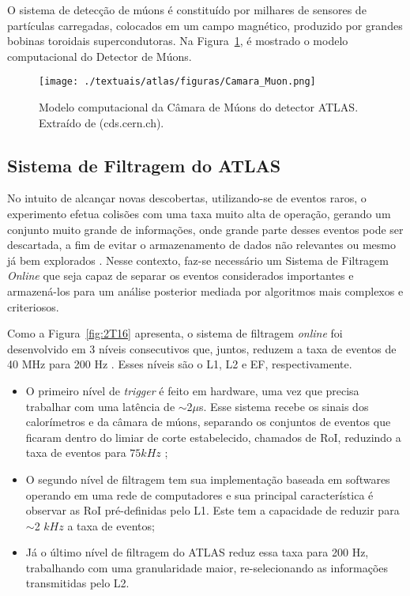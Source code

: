 O sistema de detecção de múons é constituído por milhares de sensores de partículas carregadas, colocados em um campo magnético, produzido por grandes bobinas toroidais supercondutoras. Na Figura~\ref{fig:2T14}, é mostrado o modelo computacional do Detector de Múons.

\begin{figure}[h!]
	\centering
	\texttt{[image: ./textuais/atlas/figuras/Camara\_Muon.png]}\\
	\caption{Modelo computacional da Câmara de Múons do detector ATLAS. Extraído de (cds.cern.ch).}
	\label{fig:2T14}
\end{figure}


\subsection{Sistema de Filtragem do ATLAS}\label{sec:sis_fil}

No intuito de alcançar novas descobertas, utilizando-se de eventos raros, o experimento efetua colisões com uma taxa muito alta de operação, gerando um conjunto muito grande de informações, onde grande parte desses eventos pode ser descartada, a fim de evitar o armazenamento de dados não relevantes ou mesmo já bem explorados \cite{1352047}. Nesse contexto, faz-se necessário um Sistema de Filtragem \emph{Online} que seja capaz de separar os eventos considerados importantes e armazená-los para um análise posterior mediada por algoritmos mais complexos e criteriosos.

Como a Figura~\ref{fig:2T16} apresenta, o sistema de filtragem \emph{online} foi desenvolvido em 3 níveis consecutivos que, juntos, reduzem a taxa de eventos de 40 MHz para 200 Hz \cite{elsing2003configuration}. Esses níveis são o \ac{L1}, \ac{L2} e \ac{EF}, respectivamente.

\begin{itemize}
  \item O primeiro nível de \emph{trigger} é feito em hardware, uma vez que precisa trabalhar com uma latência de $\sim$2$\mu$s. Esse sistema recebe os sinais dos calorímetros e da câmara de múons, separando os conjuntos de eventos que ficaram dentro do limiar de corte estabelecido, chamados de \ac{RoI}, reduzindo a taxa de eventos para $75 kHz$ \cite{gabaldon2012performance};
  \item O segundo nível de filtragem tem sua implementação baseada em softwares operando em uma rede de computadores e sua principal característica é observar as \ac{RoI} pré-definidas pelo L1. Este tem a capacidade de reduzir para $\sim$2 $kHz$ a taxa de eventos;
  \item Já o último nível de filtragem do ATLAS reduz essa taxa para 200 Hz, trabalhando com uma granularidade maior, re-selecionando as informações transmitidas pelo L2.
\end{itemize}


